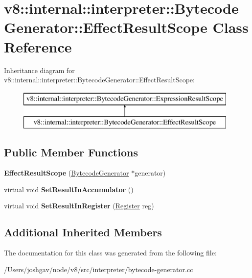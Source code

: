 \hypertarget{classv8_1_1internal_1_1interpreter_1_1_bytecode_generator_1_1_effect_result_scope}{}\section{v8\+:\+:internal\+:\+:interpreter\+:\+:Bytecode\+Generator\+:\+:Effect\+Result\+Scope Class Reference}
\label{classv8_1_1internal_1_1interpreter_1_1_bytecode_generator_1_1_effect_result_scope}
Inheritance diagram for v8\+:\+:internal\+:\+:interpreter\+:\+:Bytecode\+Generator\+:\+:Effect\+Result\+Scope\+:\begin{figure}[H]
\begin{center}
\leavevmode
\includegraphics[height=2.000000cm]{classv8_1_1internal_1_1interpreter_1_1_bytecode_generator_1_1_effect_result_scope}
\end{center}
\end{figure}
\subsection*{Public Member Functions}
\begin{DoxyCompactItemize}
\item 
{\bfseries Effect\+Result\+Scope} (\hyperlink{classv8_1_1internal_1_1interpreter_1_1_bytecode_generator}{Bytecode\+Generator} $\ast$generator)\hypertarget{classv8_1_1internal_1_1interpreter_1_1_bytecode_generator_1_1_effect_result_scope_a08e55be62b1fb53c8fc1525ed1d408ce}{}\label{classv8_1_1internal_1_1interpreter_1_1_bytecode_generator_1_1_effect_result_scope_a08e55be62b1fb53c8fc1525ed1d408ce}

\item 
virtual void {\bfseries Set\+Result\+In\+Accumulator} ()\hypertarget{classv8_1_1internal_1_1interpreter_1_1_bytecode_generator_1_1_effect_result_scope_ace0d0c362566e73bf36cbd575ce9759c}{}\label{classv8_1_1internal_1_1interpreter_1_1_bytecode_generator_1_1_effect_result_scope_ace0d0c362566e73bf36cbd575ce9759c}

\item 
virtual void {\bfseries Set\+Result\+In\+Register} (\hyperlink{classv8_1_1internal_1_1interpreter_1_1_register}{Register} reg)\hypertarget{classv8_1_1internal_1_1interpreter_1_1_bytecode_generator_1_1_effect_result_scope_ab89af5c6589a9d06d4dc4a468ead6b7c}{}\label{classv8_1_1internal_1_1interpreter_1_1_bytecode_generator_1_1_effect_result_scope_ab89af5c6589a9d06d4dc4a468ead6b7c}

\end{DoxyCompactItemize}
\subsection*{Additional Inherited Members}


The documentation for this class was generated from the following file\+:\begin{DoxyCompactItemize}
\item 
/\+Users/joshgav/node/v8/src/interpreter/bytecode-\/generator.\+cc\end{DoxyCompactItemize}
